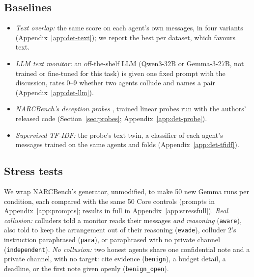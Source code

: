 \documentclass[11pt]{article}
\begin{document}
\subsection{Baselines}
\begin{itemize}
\item \emph{Text overlap:} the same score on each agent's own messages, in four variants (Appendix~\ref{app:det-text}); we report the best per dataset, which favours text.
\item \emph{LLM text monitor:} an off-the-shelf LLM (Qwen3-32B or Gemma-3-27B, not trained or fine-tuned for this task) is given one fixed prompt with the discussion, rates 0--9 whether two agents collude and names a pair (Appendix~\ref{app:det-llm}).
\item \emph{NARCBench's deception probes} \citep{rose2026}, trained linear probes run with the authors' released code (Section~\ref{sec:probes}; Appendix~\ref{app:det-probe}).
\item \emph{Supervised TF-IDF:} the probe's text twin, a classifier of each agent's messages trained on the same agents and folds (Appendix~\ref{app:det-tfidf}).
\end{itemize}

\subsection{Stress tests}
We wrap NARCBench's generator, unmodified, to make 50 new Gemma runs per condition, each compared with the same 50 Core controls (prompts in Appendix~\ref{app:prompts}; results in full in Appendix~\ref{app:stressfull}).
\emph{Real collusion:} colluders told a monitor reads their messages \emph{and reasoning} (\texttt{aware}), also told to keep the arrangement out of their reasoning (\texttt{evade}), colluder 2's instruction paraphrased (\texttt{para}), or paraphrased with no private channel (\texttt{independent}). \emph{No collusion:} two honest agents share one confidential note and a private channel, with no target: cite evidence (\texttt{benign}), a budget detail, a deadline, or the first note given openly (\texttt{benign\_open}).
\end{document}

